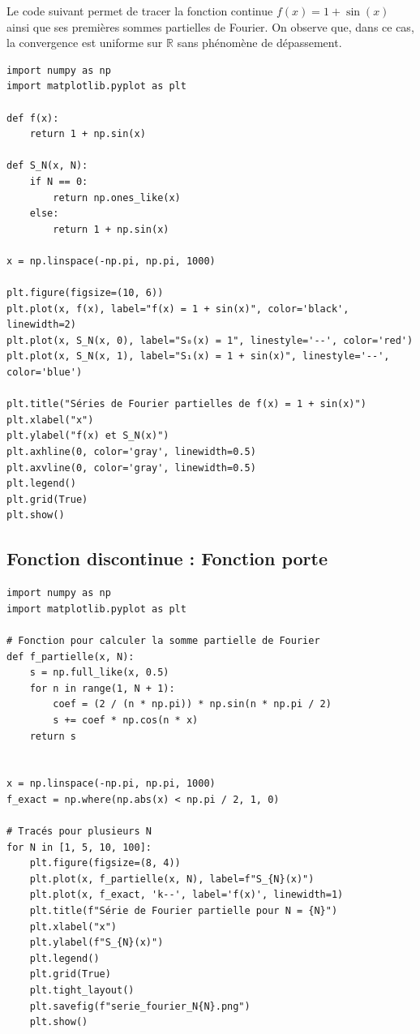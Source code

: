\documentclass[11pt]{article} %
\begin{document}
\begin{large}
Le code suivant permet de tracer la fonction continue \( f(x) = 1 + \sin(x) \) ainsi que ses premières sommes partielles de Fourier. On observe que, dans ce cas, la convergence est uniforme sur \( \mathbb{R} \) sans phénomène de dépassement.

\begin{verbatim}
import numpy as np
import matplotlib.pyplot as plt

def f(x):
    return 1 + np.sin(x)

def S_N(x, N):
    if N == 0:
        return np.ones_like(x)
    else:
        return 1 + np.sin(x)

x = np.linspace(-np.pi, np.pi, 1000)

plt.figure(figsize=(10, 6))
plt.plot(x, f(x), label="f(x) = 1 + sin(x)", color='black', linewidth=2)
plt.plot(x, S_N(x, 0), label="S₀(x) = 1", linestyle='--', color='red')
plt.plot(x, S_N(x, 1), label="S₁(x) = 1 + sin(x)", linestyle='--', color='blue')

plt.title("Séries de Fourier partielles de f(x) = 1 + sin(x)")
plt.xlabel("x")
plt.ylabel("f(x) et S_N(x)")
plt.axhline(0, color='gray', linewidth=0.5)
plt.axvline(0, color='gray', linewidth=0.5)
plt.legend()
plt.grid(True)
plt.show()
\end{verbatim}


\label{annexe_code_python}
\subsection{Fonction discontinue : Fonction porte}

\begin{verbatim}
import numpy as np
import matplotlib.pyplot as plt

# Fonction pour calculer la somme partielle de Fourier
def f_partielle(x, N):
    s = np.full_like(x, 0.5)
    for n in range(1, N + 1):
        coef = (2 / (n * np.pi)) * np.sin(n * np.pi / 2)
        s += coef * np.cos(n * x)
    return s


x = np.linspace(-np.pi, np.pi, 1000)
f_exact = np.where(np.abs(x) < np.pi / 2, 1, 0)

# Tracés pour plusieurs N
for N in [1, 5, 10, 100]:
    plt.figure(figsize=(8, 4))
    plt.plot(x, f_partielle(x, N), label=f"S_{N}(x)")
    plt.plot(x, f_exact, 'k--', label='f(x)', linewidth=1)
    plt.title(f"Série de Fourier partielle pour N = {N}")
    plt.xlabel("x")
    plt.ylabel(f"S_{N}(x)")
    plt.legend()
    plt.grid(True)
    plt.tight_layout()
    plt.savefig(f"serie_fourier_N{N}.png")
    plt.show()
\end{verbatim}




\end{large}
\end{document}
